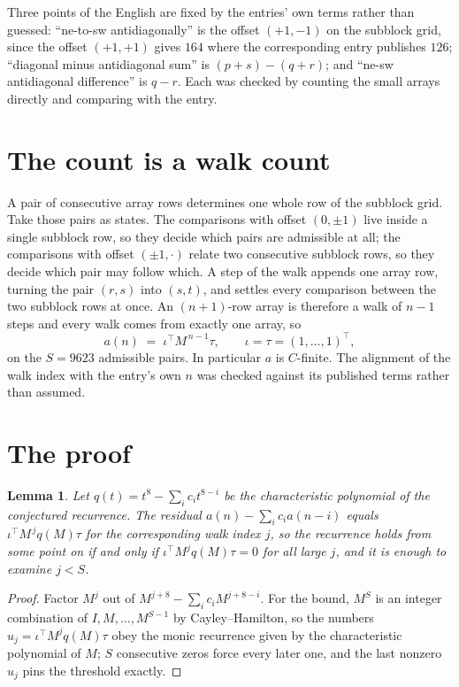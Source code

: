 \documentclass[11pt,a4paper]{article}
\theoremstyle{plain}
\newtheorem{lemma}[theorem]{Lemma}
\theoremstyle{definition}
\begin{document}
Three points of the English are fixed by the entries' own terms rather than guessed:
``ne-to-sw antidiagonally'' is the offset $(+1,-1)$ on the subblock grid, since the offset
$(+1,+1)$ gives $164$ where the corresponding entry publishes $126$; ``diagonal minus
antidiagonal sum'' is $(p+s)-(q+r)$; and ``ne-sw antidiagonal difference'' is $q-r$. Each was
checked by counting the small arrays directly and comparing with the entry.

\section{The count is a walk count}

A pair of consecutive array rows determines one whole row of the subblock grid. Take those
pairs as states. The comparisons with offset $(0,\pm1)$ live inside a single subblock row, so
they decide which pairs are admissible at all; the comparisons with offset $(\pm1,\cdot)$
relate two consecutive subblock rows, so they decide which pair may follow which. A step of the
walk appends one array row, turning the pair $(r,s)$ into $(s,t)$, and settles every comparison
between the two subblock rows at once. An $(n+1)$-row array is therefore a walk of $n-1$ steps
and every walk comes from exactly one array, so
\[
a(n)\;=\;\iota^{\!\top}M^{\,n-1}\tau,\qquad \iota=\tau=(1,\dots,1)^{\!\top},
\]
on the $S=9623$ admissible pairs. In particular $a$ is $C$-finite. The alignment of the walk
index with the entry's own $n$ was checked against its published terms rather than assumed.

\section{The proof}

\begin{lemma}\label{lem:crit}
Let $q(t)=t^{8}-\sum_i c_it^{8-i}$ be the characteristic polynomial of the
conjectured recurrence. The residual $a(n)-\sum_ic_ia(n-i)$ equals
$\iota^{\!\top}M^{\,j}q(M)\tau$ for the corresponding walk index $j$, so the recurrence
holds from some point on if and only if $\iota^{\!\top}M^{j}q(M)\tau=0$ for all large $j$,
and it is enough to examine $j<S$.
\end{lemma}

\begin{proof}
Factor $M^{j}$ out of $M^{j+8}-\sum_ic_iM^{j+8-i}$. For the bound, $M^{S}$
is an integer combination of $I,M,\dots,M^{S-1}$ by Cayley--Hamilton, so the numbers
$u_j=\iota^{\!\top}M^{j}q(M)\tau$ obey the monic recurrence given by the characteristic
polynomial of $M$; $S$ consecutive zeros force every later one, and the last nonzero $u_j$
pins the threshold exactly.
\end{proof}
\end{document}
